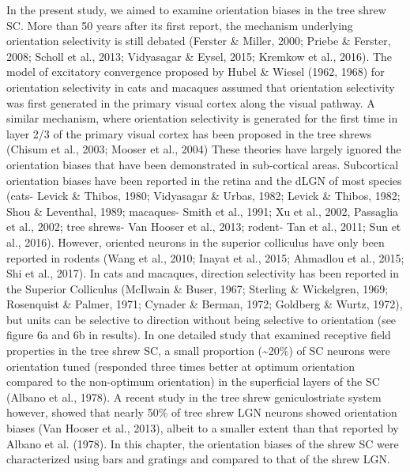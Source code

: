 In the present study, we aimed to examine orientation biases in the tree
shrew SC. More than 50 years after its first report, the mechanism
underlying orientation selectivity is still debated (Ferster \& Miller,
2000; Priebe \& Ferster, 2008; Scholl et al., 2013; Vidyasagar \& Eysel,
2015; Kremkow et al., 2016). The model of excitatory convergence
proposed by Hubel \& Wiesel (1962, 1968) for orientation selectivity in
cats and macaques assumed that orientation selectivity was first
generated in the primary visual cortex along the visual pathway. A
similar mechanism, where orientation selectivity is generated for the
first time in layer 2/3 of the primary visual cortex has been proposed
in the tree shrews (Chisum et al., 2003; Mooser et al., 2004) These
theories have largely ignored the orientation biases that have been
demonstrated in sub-cortical areas. Subcortical orientation biases have
been reported in the retina and the dLGN of most species (cats- Levick
\& Thibos, 1980; Vidyasagar \& Urbas, 1982; Levick \& Thibos, 1982; Shou
\& Leventhal, 1989; macaques- Smith et al., 1991; Xu et al., 2002,
Passaglia et al., 2002; tree shrews- Van Hooser et al., 2013; rodent-
Tan et al., 2011; Sun et al., 2016). However, oriented neurons in the
superior colliculus have only been reported in rodents (Wang et al.,
2010; Inayat et al., 2015; Ahmadlou et al., 2015; Shi et al., 2017). In
cats and macaques, direction selectivity has been reported in the
Superior Colliculus (McIlwain \& Buser, 1967; Sterling \& Wickelgren,
1969; Rosenquist \& Palmer, 1971; Cynader \& Berman, 1972; Goldberg \&
Wurtz, 1972), but units can be selective to direction without being
selective to orientation (see figure 6a and 6b in results). In one
detailed study that examined receptive field properties in the tree
shrew SC, a small proportion (\textasciitilde{}20\%) of SC neurons were
orientation tuned (responded three times better at optimum orientation
compared to the non-optimum orientation) in the superficial layers of
the SC (Albano et al., 1978). A recent study in the tree shrew
geniculostriate system however, showed that nearly 50\% of tree shrew
LGN neurons showed orientation biases (Van Hooser et al., 2013), albeit
to a smaller extent than that reported by Albano et al. (1978). In this
chapter, the orientation biases of the shrew SC were characterized using
bars and gratings and compared to that of the shrew LGN.

